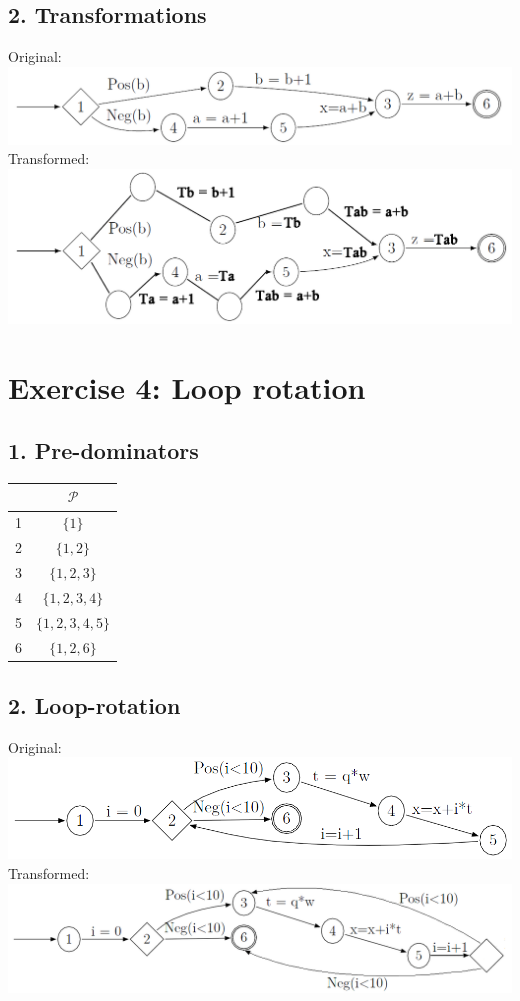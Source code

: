 \documentclass[11pt,a4paper]{scrartcl}
\begin{document}
\subsection*{2. Transformations}
Original:\\
\includegraphics[width=\linewidth]{3org}\\
Transformed:\\
\includegraphics[width=\linewidth]{3}


\section*{Exercise 4: Loop rotation}
\subsection*{1. Pre-dominators}
\begin{tabular}{|c|c|}
\hline
 & $\mathcal{P}$ \\
\hline
1 & $\{1\}$ \\
2 & $\{1, 2\}$ \\
3 & $\{1, 2, 3\}$ \\
4 & $\{1, 2, 3, 4\}$ \\
5 & $\{1, 2, 3, 4, 5\}$ \\
6 & $\{1, 2, 6\}$ \\
\hline
\end{tabular}

\subsection*{2. Loop-rotation}
Original:\\
\includegraphics[width=\linewidth]{4org}\\
Transformed:\\
\includegraphics[width=\linewidth]{4}
\end{document}
